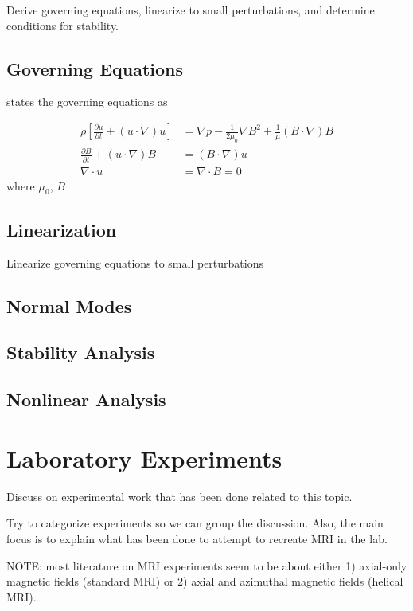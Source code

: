 \documentclass{jfm}
\newcommand{\del}{\nabla}
\begin{document}
Derive governing equations, linearize to small perturbations, and determine 
conditions for stability.

\subsection{Governing Equations}
\cite{Julien2010} states the governing equations as

\begin{align}
    \rho \left[ \frac{\partial u}{\partial t} + (u \cdot \del) u \right] &= \del p - \frac{1}{2 \mu_0} \del B^2 + \frac{1}{\mu} (B \cdot \del) B \\
    \frac{\partial B}{\partial t} + (u \cdot \del) B &= (B \cdot \del) u \\
    \del \cdot u &= \del \cdot B = 0
\end{align}
where $\mu_0$, $B$


\subsection{Linearization}
Linearize governing equations to small perturbations


\subsection{Normal Modes}


\subsection{Stability Analysis}


\subsection{Nonlinear Analysis}



\section{Laboratory Experiments}
Discuss on experimental work that has been done related to this topic.

Try to categorize experiments so we can group the discussion. Also, the main
focus is to explain what has been done to attempt to recreate MRI in the lab.

NOTE: most literature on MRI experiments seem to be about either 1) axial-only
magnetic fields (standard MRI) or 2) axial and azimuthal magnetic fields
(helical MRI).
\end{document}
